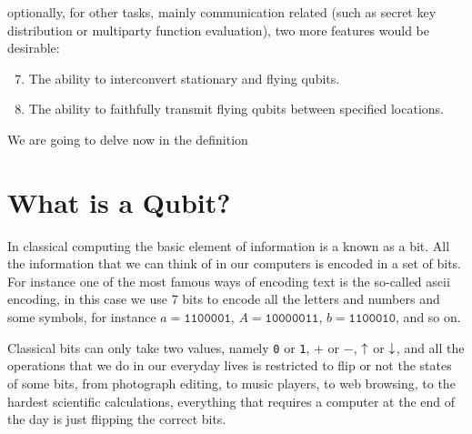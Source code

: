 optionally, for other tasks, mainly communication related (such as secret key distribution or multiparty function evaluation)\cite{DiVincenzo1999}, two more features would be desirable:
\begin{enumerate}
  \setcounter{enumi}{6}
  \item The ability to interconvert stationary and flying qubits\cite{Turchette1995,Imamoglu1999}.
  \item The ability to faithfully transmit flying qubits between specified locations.
\end{enumerate}


We are going to delve  now in the definition





\section{What is a Qubit?}
In classical computing the basic element of information is a known as a bit. All the information that we can think of in our computers is encoded in a set of bits.
For instance one of the most famous ways of encoding text is the so-called \ac{ascii} encoding, in this case we use 7 bits to encode all the letters and numbers and some symbols, for instance $a=\texttt{1100001}$, $A=\texttt{10000011}$, $b=\texttt{1100010}$, and so on.

Classical bits can only take two values, namely \texttt{0} or \texttt{1}, $+$ or $-$, $\uparrow$ or $\downarrow$, and all the operations that we do in our everyday lives is restricted to flip or not the states of some bits, from photograph editing, to music players, to web browsing, to the hardest scientific calculations, everything that requires a computer at the end of the day is just flipping the correct bits.


